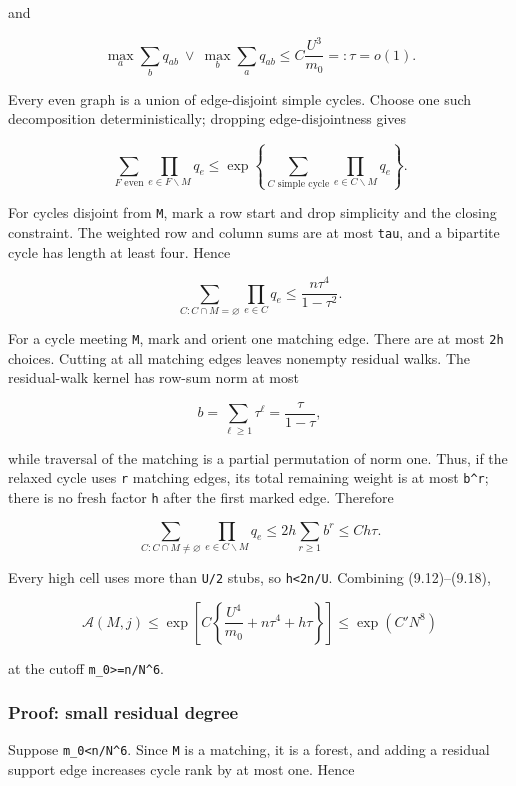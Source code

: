 \documentclass[
  11pt,
  a4paper,
]{article}
\renewcommand{\setminus}{\mathbin{\backslash}}%
\begin{document}
and

\[
 \max_a\sum_bq_{ab}\ \vee\ \max_b\sum_aq_{ab}
 \le C\frac{U^3}{m_0}=:\tau=o(1).                       \tag{9.14}
\]

Every even graph is a union of edge-disjoint simple cycles. Choose one
such decomposition deterministically; dropping edge-disjointness gives

\[
 \sum_{F\text{ even}}\prod_{e\in F\setminus M}q_e
 \le\exp\left\{\sum_{C\text{ simple cycle}}
                  \prod_{e\in C\setminus M}q_e\right\}. \tag{9.15}
\]

For cycles disjoint from \texttt{M}, mark a row start and drop
simplicity and the closing constraint. The weighted row and column sums
are at most \texttt{tau}, and a bipartite cycle has length at least
four. Hence

\[
 \sum_{C:C\cap M=\varnothing}\prod_{e\in C}q_e
 \le\frac{n\tau^4}{1-\tau^2}.                            \tag{9.16}
\]

For a cycle meeting \texttt{M}, mark and orient one matching edge. There
are at most \texttt{2h} choices. Cutting at all matching edges leaves
nonempty residual walks. The residual-walk kernel has row-sum norm at
most

\[
 b=\sum_{\ell\ge1}\tau^\ell=\frac\tau{1-\tau},          \tag{9.17}
\]

while traversal of the matching is a partial permutation of norm one.
Thus, if the relaxed cycle uses \texttt{r} matching edges, its total
remaining weight is at most \texttt{b\^{}r}; there is no fresh factor
\texttt{h} after the first marked edge. Therefore

\[
 \sum_{C:C\cap M\ne\varnothing}
       \prod_{e\in C\setminus M}q_e
 \le2h\sum_{r\ge1}b^r\le Ch\tau.                        \tag{9.18}
\]

Every high cell uses more than \texttt{U/2} stubs, so
\texttt{h\textless{}2n/U}. Combining (9.12)--(9.18),

\[
 \mathcal A(M,j)
 \le\exp\left[C\left\{\frac{U^4}{m_0}+n\tau^4+h\tau\right\}\right]
 \le\exp(C'N^8)                                          \tag{9.19}
\]

at the cutoff \texttt{m\_0\textgreater{}=n/N\^{}6}.

\subsubsection{Proof: small residual
degree}\label{proof-small-residual-degree}

Suppose \texttt{m\_0\textless{}n/N\^{}6}. Since \texttt{M} is a
matching, it is a forest, and adding a residual support edge increases
cycle rank by at most one. Hence
\end{document}
